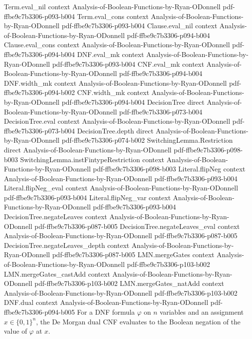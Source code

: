 \begin{lemma}
\proofstep
  {Term.eval_nil}
  {context}
  {Analysis-of-Boolean-Functions-by-Ryan-ODonnell}
  {pdf-ffbe9c7b3306-p093-b004}
\proofstep
  {Term.eval_cons}
  {context}
  {Analysis-of-Boolean-Functions-by-Ryan-ODonnell}
  {pdf-ffbe9c7b3306-p093-b004}
\proofstep
  {Clause.eval_nil}
  {context}
  {Analysis-of-Boolean-Functions-by-Ryan-ODonnell}
  {pdf-ffbe9c7b3306-p094-b004}
\proofstep
  {Clause.eval_cons}
  {context}
  {Analysis-of-Boolean-Functions-by-Ryan-ODonnell}
  {pdf-ffbe9c7b3306-p094-b004}
\proofstep
  {DNF.eval_mk}
  {context}
  {Analysis-of-Boolean-Functions-by-Ryan-ODonnell}
  {pdf-ffbe9c7b3306-p093-b004}
\proofstep
  {CNF.eval_mk}
  {context}
  {Analysis-of-Boolean-Functions-by-Ryan-ODonnell}
  {pdf-ffbe9c7b3306-p094-b004}
\proofstep
  {DNF.width_mk}
  {context}
  {Analysis-of-Boolean-Functions-by-Ryan-ODonnell}
  {pdf-ffbe9c7b3306-p094-b002}
\proofstep
  {CNF.width_mk}
  {context}
  {Analysis-of-Boolean-Functions-by-Ryan-ODonnell}
  {pdf-ffbe9c7b3306-p094-b004}
\proofstep
  {DecisionTree}
  {direct}
  {Analysis-of-Boolean-Functions-by-Ryan-ODonnell}
  {pdf-ffbe9c7b3306-p073-b004}
\proofstep
  {DecisionTree.eval}
  {context}
  {Analysis-of-Boolean-Functions-by-Ryan-ODonnell}
  {pdf-ffbe9c7b3306-p073-b004}
\proofstep
  {DecisionTree.depth}
  {direct}
  {Analysis-of-Boolean-Functions-by-Ryan-ODonnell}
  {pdf-ffbe9c7b3306-p074-b002}
\proofstep
  {SwitchingLemma.Restriction}
  {direct}
  {Analysis-of-Boolean-Functions-by-Ryan-ODonnell}
  {pdf-ffbe9c7b3306-p098-b003}
\proofstep
  {SwitchingLemma.instFintypeRestriction}
  {context}
  {Analysis-of-Boolean-Functions-by-Ryan-ODonnell}
  {pdf-ffbe9c7b3306-p098-b003}
\proofstep
  {Literal.flipNeg}
  {context}
  {Analysis-of-Boolean-Functions-by-Ryan-ODonnell}
  {pdf-ffbe9c7b3306-p093-b004}
\proofstep
  {Literal.flipNeg_eval}
  {context}
  {Analysis-of-Boolean-Functions-by-Ryan-ODonnell}
  {pdf-ffbe9c7b3306-p093-b004}
\proofstep
  {Literal.flipNeg_var}
  {context}
  {Analysis-of-Boolean-Functions-by-Ryan-ODonnell}
  {pdf-ffbe9c7b3306-p093-b004}
\proofstep
  {DecisionTree.negateLeaves}
  {context}
  {Analysis-of-Boolean-Functions-by-Ryan-ODonnell}
  {pdf-ffbe9c7b3306-p087-b005}
\proofstep
  {DecisionTree.negateLeaves_eval}
  {context}
  {Analysis-of-Boolean-Functions-by-Ryan-ODonnell}
  {pdf-ffbe9c7b3306-p087-b005}
\proofstep
  {DecisionTree.negateLeaves_depth}
  {context}
  {Analysis-of-Boolean-Functions-by-Ryan-ODonnell}
  {pdf-ffbe9c7b3306-p087-b005}
\proofstep
  {LMN.mergeGates}
  {context}
  {Analysis-of-Boolean-Functions-by-Ryan-ODonnell}
  {pdf-ffbe9c7b3306-p103-b002}
\proofstep
  {LMN.mergeGates_castAdd}
  {context}
  {Analysis-of-Boolean-Functions-by-Ryan-ODonnell}
  {pdf-ffbe9c7b3306-p103-b002}
\proofstep
  {LMN.mergeGates_natAdd}
  {context}
  {Analysis-of-Boolean-Functions-by-Ryan-ODonnell}
  {pdf-ffbe9c7b3306-p103-b002}
\proofstep
  {DNF.dual}
  {context}
  {Analysis-of-Boolean-Functions-by-Ryan-ODonnell}
  {pdf-ffbe9c7b3306-p094-b005}
For a DNF formula $\varphi$ on $n$ variables and an assignment $x\in\{0,1\}^n$, the De
Morgan dual CNF evaluates to the Boolean negation of the value of $\varphi$ at $x$.
\end{lemma}

